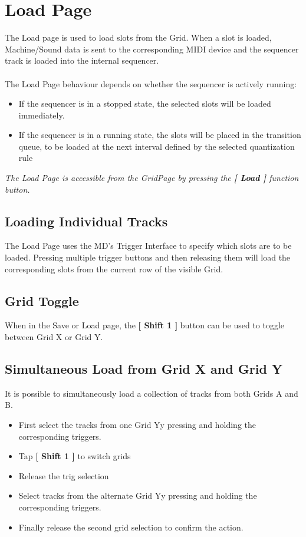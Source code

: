 \chapter{Load Page}
The Load page is used to load slots from the Grid. When a slot is loaded, Machine/Sound data is sent to the corresponding MIDI device and the sequencer track is loaded into the internal sequencer.\\
\\
The Load Page behaviour depends on whether the sequencer is actively running:
\begin{itemize}
    \item If the sequencer is in a stopped state, the selected slots will be loaded immediately.
    \item If the sequencer is in a running state, the slots will be placed in the transition queue, to be loaded at the next interval defined by the selected quantization rule
\end{itemize}
\textit{The Load Page is accessible from the GridPage by pressing the  \textbf{[ Load ]} function button.}

\section{Loading Individual Tracks}
The Load Page uses the MD's Trigger Interface to specify which slots are to be loaded. Pressing multiple trigger buttons and then releasing them will load the corresponding slots from the current row of the visible Grid.
\section{Grid Toggle}
When in the Save or Load page, the \textbf{[ Shift 1 ]} button can be used to toggle between Grid X or Grid Y.
\newpage
\section{Simultaneous Load from Grid X and Grid Y}
It is possible to simultaneously load a collection of tracks from both Grids A and B. 
\begin{itemize}
\item First select the tracks from one Grid Yy pressing and holding the corresponding triggers.
\item Tap \textbf{[ Shift 1 ]} to switch grids
\item Release the trig selection
\item Select tracks from the alternate Grid Yy pressing and holding the corresponding triggers. 
\item Finally release the second grid selection to confirm the action. 
\end{itemize}

